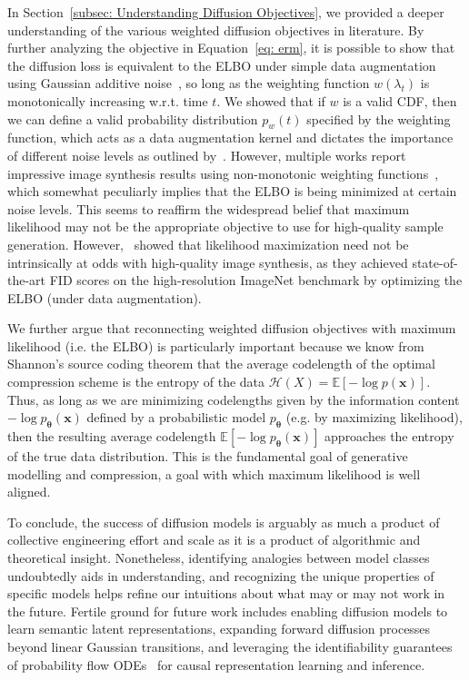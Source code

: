 In Section~\ref{subsec: Understanding Diffusion Objectives}, we provided a deeper understanding of the various weighted diffusion objectives in literature. By further analyzing the objective in Equation~\ref{eq: erm}, it is possible to show that the diffusion loss is equivalent to the ELBO under simple data augmentation using Gaussian additive noise~\citep{kingma2023understanding}, so long as the weighting function $w(\lambda_t)$ is monotonically increasing w.r.t. time $t$. We showed that if $w$ is a valid CDF, then we can define a valid probability distribution $p_w(t)$ specified by the weighting function, which acts as a data augmentation kernel and dictates the importance of different noise levels as outlined by~\cite{kingma2023understanding}. However, multiple works report impressive image synthesis results using non-monotonic weighting functions~\citep{nichol2021improved, karras2022elucidating}, which somewhat peculiarly implies that the ELBO is being minimized at certain noise levels. This seems to reaffirm the widespread belief that maximum likelihood may not be the appropriate objective to use for high-quality sample generation. However,~\cite{kingma2023understanding} showed that likelihood maximization need not be intrinsically at odds with high-quality image synthesis, as they achieved state-of-the-art FID scores on the high-resolution ImageNet benchmark by optimizing the ELBO (under data augmentation).

We further argue that reconnecting weighted diffusion objectives with maximum likelihood (i.e. the ELBO) is particularly important because we know from Shannon's source coding theorem that the average codelength of the optimal compression scheme is the entropy of the data $\mathbb{\mathcal{H}}(X) = \mathbb{E}[-\log p(\mathbf{x})]$. Thus, as long as we are minimizing codelengths given by the information content $-\log p_{\boldsymbol{\theta}}(\mathbf{x})$ defined by a probabilistic model $p_{\boldsymbol{\theta}}$ (e.g. by maximizing likelihood), then the resulting average codelength $\mathbb{E}[-\log p_{\boldsymbol{\theta}}(\mathbf{x})]$ approaches the entropy of the true data distribution. This is the fundamental goal of generative modelling and compression, a goal with which maximum likelihood is well aligned.

To conclude, the success of diffusion models is arguably as much a product of collective engineering effort and scale as it is a product of algorithmic and theoretical insight. Nonetheless, identifying analogies between model classes undoubtedly aids in understanding, and recognizing the unique properties of specific models helps refine our intuitions about what may or may not work in the future. Fertile ground for future work includes enabling diffusion models to learn semantic latent representations, expanding forward diffusion processes beyond linear Gaussian transitions, and leveraging the identifiability guarantees of probability flow ODEs~\citep{song2021scorebased} for causal representation learning and inference.